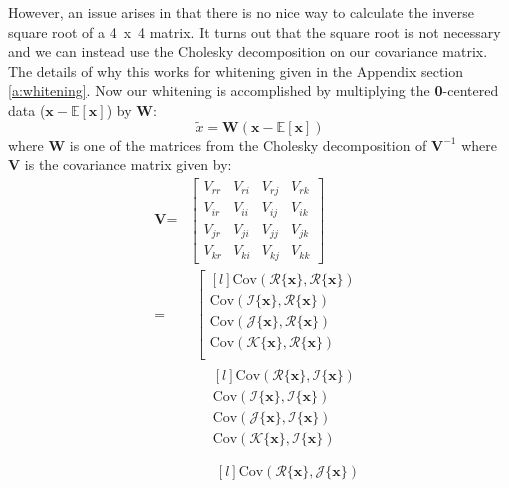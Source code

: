 \documentclass[conference]{IEEEtran}
\begin{document}
However, an issue arises in that there is no nice way to calculate the inverse square root of a 4~x~4 matrix.
It turns out that the square root is not necessary and we can instead use the Cholesky decomposition on our covariance matrix.
The details of why this works for whitening given in the Appendix section \ref{a:whitening}.
Now our whitening is accomplished by multiplying the \textbf{0}-centered data ($\textbf{x} - \mathbb{E}[\textbf{x}]$) by \textbf{W}:
\begin{equation}
\tilde{x} = \textbf{W}(\textbf{x} - \mathbb{E}[\textbf{x}])
\label{eq:white4d}
\end{equation}
where \textbf{W} is one of the matrices from the Cholesky decomposition of $\textbf{V}^{-1}$ where \textbf{V} is the covariance matrix given by:
\begin{align}
\textbf{V}
=&
\begin{bmatrix}
 V_{rr} & V_{ri} & V_{rj} & V_{rk} \\
 V_{ir} & V_{ii} & V_{ij} & V_{ik} \\
 V_{jr} & V_{ji} & V_{jj} & V_{jk} \\
 V_{kr} & V_{ki} & V_{kj} & V_{kk}
\end{bmatrix} \nonumber \\
=&~~  \left[ 
\begin{matrix*}[l]
\mbox{Cov}(\mathscr{R}\{\textbf{x}\}, \mathscr{R}\{\textbf{x}\}) \\
\mbox{Cov}(\mathscr{I}\{\textbf{x}\}, \mathscr{R}\{\textbf{x}\}) \\
\mbox{Cov}(\mathscr{J}\{\textbf{x}\}, \mathscr{R}\{\textbf{x}\}) \\
\mbox{Cov}(\mathscr{K}\{\textbf{x}\}, \mathscr{R}\{\textbf{x}\}) \\
\end{matrix*} \right. \nonumber \\ 
&~~~~~~
\begin{matrix*}[l]
\mbox{Cov}(\mathscr{R}\{\textbf{x}\}, \mathscr{I}\{\textbf{x}\}) \\
\mbox{Cov}(\mathscr{I}\{\textbf{x}\}, \mathscr{I}\{\textbf{x}\}) \\
\mbox{Cov}(\mathscr{J}\{\textbf{x}\}, \mathscr{I}\{\textbf{x}\}) \\
\mbox{Cov}(\mathscr{K}\{\textbf{x}\}, \mathscr{I}\{\textbf{x}\}) \\
\end{matrix*} \nonumber \\
&~~~~~~~
\begin{matrix*}[l]
\mbox{Cov}(\mathscr{R}\{\textbf{x}\}, \mathscr{J}\{\textbf{x}\}) \\

\end{matrix*}
\end{align}
\end{document}
